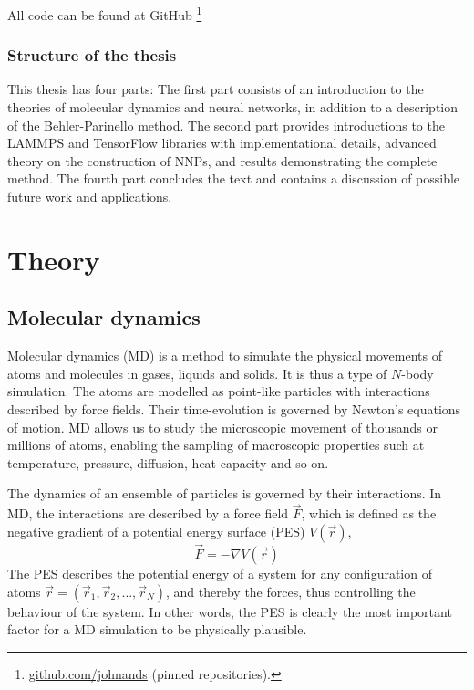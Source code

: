 \documentclass[twoside,english]{uiofysmaster}
\begin{document}
All code can be found at GitHub \footnote{\href{https://github.com/johnands}{github.com/johnands} (pinned repositories).}




\section{Structure of the thesis}
This thesis has four parts: The first part consists of an introduction to the theories of 
molecular dynamics and neural networks, in addition to a description of the Behler-Parinello method.  
The second part provides introductions to the LAMMPS and TensorFlow libraries with implementational details, 
advanced theory on the construction of NNPs, and results demonstrating the complete method. 
The fourth part concludes the text and contains a discussion of possible future work and applications. 




\part{Theory}

\chapter{Molecular dynamics}
Molecular dynamics (MD) is a method to simulate the physical movements of atoms and molecules in gases, liquids and solids. 
It is thus a type of $N$-body simulation. The atoms are modelled as point-like particles with interactions described
by force fields. Their time-evolution is governed by Newton's equations of motion. MD allows us to study the microscopic
movement of thousands or millions of atoms, enabling the sampling of macroscopic properties such at temperature, pressure, 
diffusion, heat capacity and so on. 

The dynamics of an ensemble of particles is governed by their interactions. 
In MD, the interactions are described
by a force field $\vec{F}$, which is defined as the negative gradient of a 
potential energy surface (PES) $V(\vec{r})$,
\begin{equation}
 \vec{F} = -\nabla V(\vec{r})
 \label{forcePES}
\end{equation}
The PES describes the potential energy of a system for any configuration of atoms 
$\vec{r} = (\vec{r}_1, \vec{r}_2, \dots, \vec{r}_N)$, and thereby the forces, thus
controlling the behaviour of the system. In other words, the PES is clearly the most important
factor for a MD simulation to be physically plausible. 
\end{document}
